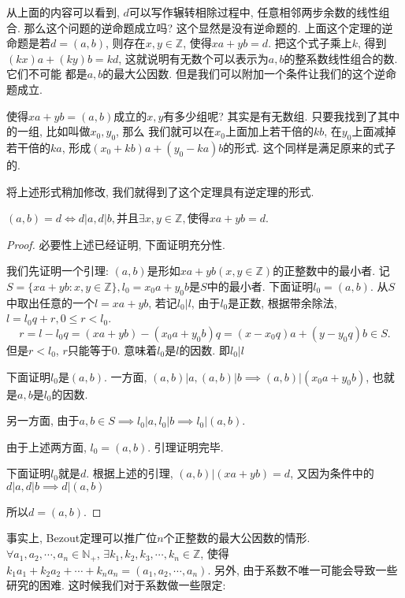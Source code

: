 从上面的内容可以看到, $d$可以写作辗转相除过程中, 任意相邻两步余数的线性组合. 那么这个问题的逆命题成立吗? 
这个显然是没有逆命题的. 上面这个定理的逆命题是若$d=(a,b)$, 则存在$x,y\in \mathbb Z$, 使得$xa+yb=d$. 
把这个式子乘上$k$, 得到$(kx)a+(ky)b=kd$, 这就说明有无数个可以表示为$a,b$的整系数线性组合的数. 它们不可能
都是$a,b$的最大公因数. 但是我们可以附加一个条件让我们的这个逆命题成立. 

使得$xa+yb=(a,b)$成立的$x,y$有多少组呢? 其实是有无数组. 只要我找到了其中的一组, 比如叫做$x_0, y_0$, 那么
我们就可以在$x_0$上面加上若干倍的$kb$, 在$y_0$上面减掉若干倍的$ka$, 形成$(x_0+kb)a+(y_0-ka)b$的形式. 
这个同样是满足原来的式子的. 

将上述形式稍加修改, 我们就得到了这个定理具有逆定理的形式. 

\begin{theorem}[充分必要的Bezout定理]
    $(a,b)=d \iff d|a, d|b,$并且$\exists x,y\in \mathbb Z, $使得$xa+yb=d$.
\end{theorem}

\begin{proof}
    必要性上述已经证明, 下面证明充分性. 

    我们先证明一个引理: $(a,b)$是形如$xa+yb(x,y\in \mathbb Z)$的正整数中的最小者. 记
    $S=\{xa+yb: x,y\in \mathbb Z\}, l_0=x_0a+y_0b$是$S$中的最小者. 下面证明$l_0=(a,b)$. 
    从$S$中取出任意的一个$l=xa+yb$, 若记$l_0|l$, 由于$l_0$是正数, 根据带余除法,  $l=l_0q+r, 0\leq r<l_0$.
    $$
    r=l-l_0q=(xa+yb)-(x_0a+y_0b)q=(x-x_0q)a+(y-y_0q)b\in S.
    $$
    但是$r<l_0$, $r$只能等于0. 意味着$l_0$是$l$的因数. 即$l_0|l$

    下面证明$l_0$是$(a,b)$. 一方面, $(a,b) | a, (a, b)| b \implies (a, b)|(x_0a+y_0b)$, 
    也就是$a,b$是$l_0$的因数. 

    另一方面, 由于$a,b\in S\implies l_0 | a, l_0 | b \implies l_0|(a, b)$.

    由于上述两方面, $l_0=(a,b)$. 引理证明完毕. 

    下面证明$l_0$就是$d$. 根据上述的引理, $(a,b)|(xa+yb)=d$, 又因为条件中的$d|a, d|b\implies d|(a,b)$

    所以$d=(a,b)$. 
\end{proof}

事实上, Bezout定理可以推广位$n$个正整数的最大公因数的情形. $\forall a_1, a_2,\cdots, a_n \in \mathbb N_+$,
$\exists k_1, k_2, k_3,\cdots, k_n\in \mathbb Z$, 使得$k_1a_1+k_2a_2+\cdots+k_na_n=(a_1, a_2,\cdots, a_n)$.
另外, 由于系数不唯一可能会导致一些研究的困难. 这时候我们对于系数做一些限定: 

